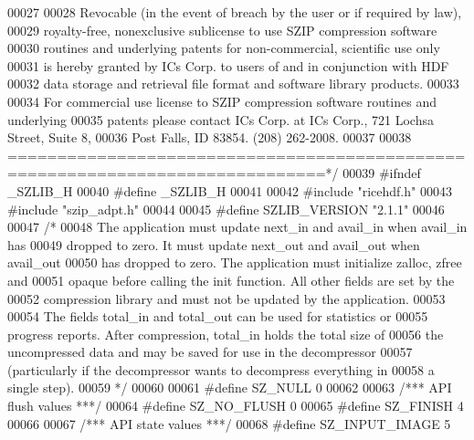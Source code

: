 \begin{DoxyCode}
00027 \textcolor{comment}{}
00028 \textcolor{comment}{Revocable (in the event of breach by the user or if required by law),}
00029 \textcolor{comment}{royalty-free, nonexclusive sublicense to use SZIP compression software}
00030 \textcolor{comment}{routines and underlying patents for non-commercial, scientific use only}
00031 \textcolor{comment}{is hereby granted by ICs Corp. to users of and in conjunction with HDF}
00032 \textcolor{comment}{data storage and retrieval file format and software library products.}
00033 \textcolor{comment}{}
00034 \textcolor{comment}{For commercial use license to SZIP compression software routines and underlying}
00035 \textcolor{comment}{patents please contact ICs Corp. at ICs Corp., 721 Lochsa Street, Suite 8,}
00036 \textcolor{comment}{Post Falls, ID 83854.  (208) 262-2008.}
00037 \textcolor{comment}{}
00038 \textcolor{comment}{==============================================================================*/}
00039 \textcolor{preprocessor}{#ifndef \_SZLIB\_H}
00040 \textcolor{preprocessor}{#define \_SZLIB\_H}
00041 
00042 \textcolor{preprocessor}{#include "ricehdf.h"}
00043 \textcolor{preprocessor}{#include "szip\_adpt.h"}
00044 
00045 \textcolor{preprocessor}{#define SZLIB\_VERSION "2.1.1"}
00046 
00047 \textcolor{comment}{/*}
00048 \textcolor{comment}{   The application must update next\_in and avail\_in when avail\_in has}
00049 \textcolor{comment}{   dropped to zero. It must update next\_out and avail\_out when avail\_out}
00050 \textcolor{comment}{   has dropped to zero. The application must initialize zalloc, zfree and}
00051 \textcolor{comment}{   opaque before calling the init function. All other fields are set by the}
00052 \textcolor{comment}{   compression library and must not be updated by the application.}
00053 \textcolor{comment}{}
00054 \textcolor{comment}{   The fields total\_in and total\_out can be used for statistics or}
00055 \textcolor{comment}{   progress reports. After compression, total\_in holds the total size of}
00056 \textcolor{comment}{   the uncompressed data and may be saved for use in the decompressor}
00057 \textcolor{comment}{   (particularly if the decompressor wants to decompress everything in}
00058 \textcolor{comment}{   a single step).}
00059 \textcolor{comment}{*/}
00060 
00061 \textcolor{preprocessor}{#define SZ\_NULL  0}
00062 
00063 \textcolor{comment}{/*** API flush values ***/}
00064 \textcolor{preprocessor}{#define SZ\_NO\_FLUSH      0}
00065 \textcolor{preprocessor}{#define SZ\_FINISH        4}
00066 
00067 \textcolor{comment}{/*** API state values ***/}
00068 \textcolor{preprocessor}{#define SZ\_INPUT\_IMAGE   5}

\end{DoxyCode}

